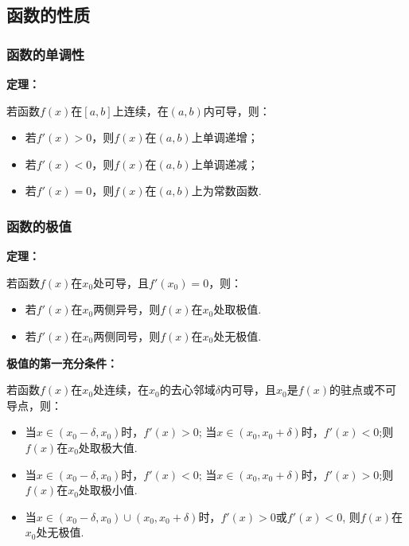 \documentclass[12pt , a4paper , oneside]{ctexart}
\begin{document}
        \subsection{函数的性质}
            \subsubsection{函数的单调性}
            \textbf{定理：}
            \begin{mdframed}
            若函数$f(x)$在$[a,b]$上连续，在$(a,b)$内可导，则：
            \begin{itemize}
                \item 若$f'(x) > 0$，则$f(x)$在$(a,b)$上单调递增；
                \item 若$f'(x) < 0$，则$f(x)$在$(a,b)$上单调递减；
                \item 若$f'(x) = 0$，则$f(x)$在$(a,b)$上为常数函数.
            \end{itemize}
            \end{mdframed}

            \subsubsection{函数的极值}
            \textbf{定理：}
            \begin{mdframed}
            若函数$f(x)$在$x_0$处可导，且$f'(x_0) = 0$，则：
            \begin{itemize}
                \item 若$f'(x)$在$x_0$两侧异号，则$f(x)$在$x_0$处取极值.
                \item 若$f'(x)$在$x_0$两侧同号，则$f(x)$在$x_0$处无极值.
            \end{itemize}
            \end{mdframed}

            \textbf{极值的第一充分条件：}
            \begin{mdframed}
            若函数$f(x)$在$x_0$处连续，在$x_0$的去心邻域$\delta$内可导，且$x_0$是$f(x)$的驻点或不可导点，则：
            \begin{itemize}
                \item 当$x \in (x_0 - \delta , x_0)$时，$f'(x) > 0$;
                当$x \in (x_0  , x_0 + \delta)$时，$f'(x) < 0$;则$f(x)$在$x_0$处取极大值.
                \item 当$x \in (x_0 - \delta , x_0)$时，$f'(x) < 0$;
                当$x \in (x_0  , x_0 + \delta)$时，$f'(x) > 0$;则$f(x)$在$x_0$处取极小值.
                \item 当$x \in (x_0 - \delta , x_0) \cup (x_0  , x_0 + \delta)$时，$f'(x) > 0$或$f'(x) < 0$,
                则$f(x)$在$x_0$处无极值.
            \end{itemize}
            \end{mdframed}
\end{document}
